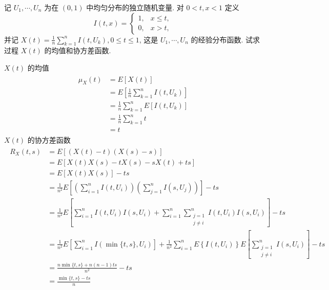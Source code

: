 \documentclass[boxes]{homework}
\begin{document}
\begin{problem}
记 $U_1, \cdots, U_n$ 为在 $(0,1)$ 中均匀分布的独立随机变量. 对 $0<t,x<1$ 定义
\begin{equation}
    I(t,x) = \begin{cases}
        1, & x \le t, \\
        0, & x > t,
    \end{cases}
\end{equation}
并记 $\displaystyle X(t) = \frac{1}{n}\sum_{k = 1}^nI(t, U_k), 0 \le t \le 1$, 这是 $U_1, \cdots, U_n$ 的经验分布函数. 试求过程 $X(t)$ 的均值和协方差函数.
\end{problem}
\begin{solution}
    $X(t)$ 的均值
    \begin{align}
        \begin{aligned}
            \mu_X(t) &= E[X(t)]\\
            &= E\left[\frac{1}{n}\sum_{k = 1}^nI(t, U_k)\right]\\
            &= \frac{1}{n}\sum_{k = 1}^nE\left[I(t, U_k)\right]\\
            &= \frac{1}{n}\sum_{k = 1}^nt\\
            &= t
        \end{aligned}
    \end{align}
    $X(t)$ 的协方差函数
    \begin{align}
        \begin{aligned}
            R_X(t, s) &=E[(X(t) - t)(X(s) - s)]\\
            &=E[X(t)X(s)-tX(s)-sX(t)+ts]\\
            &=E[X(t)X(s)]-ts\\
            &=\frac{1}{n^2}E\left[\left(\sum_{i = 1}^n I(t, U_i)\right)\left(\sum_{j = 1}^nI(s, U_j)\right)\right] - ts\\
            &=\frac{1}{n^2}E\left[\sum_{i = 1}^n I(t, U_i)I(s,U_i)+\sum_{i=1}^n\sum_{\substack{j = 1\\j\not=i}}^nI(t, U_i)I(s,U_i)\right]-ts\\
            &=\frac{1}{n^2}E\left[\sum_{i = 1}^nI(\min\{t,s\},U_i)\right]+\frac{1}{n^2}\sum_{i=1}^nE\left\{I(t,U_i)\right\}E\left[\sum_{\substack{j = 1\\j\not=i}}^nI(s,U_i)\right]-ts\\
            &=\frac{n\min\{t,s\}+n(n-1)ts}{n^2}-ts\\
            &=\frac{\min\{t,s\}-ts}{n}
        \end{aligned}
    \end{align}
\end{solution}
\end{document}
